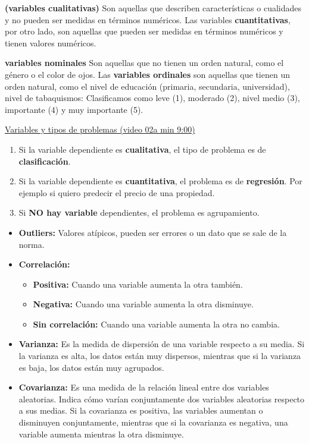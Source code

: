 \documentclass[../main.tex]{subfiles}
\begin{document}
    \begin{definition}\textbf{(variables cualitativas)} 
        Son aquellas que describen características o cualidades y no pueden ser medidas en términos numéricos. Las variables \textbf{cuantitativas}, por otro lado, son aquellas que pueden ser medidas en términos numéricos y tienen valores numéricos.
    \end{definition}
        
    \begin{definition}\textbf{variables nominales}
        Son aquellas que no tienen un orden natural, como el género o el color de ojos. Las \textbf{variables ordinales} son aquellas que tienen un orden natural, como el nivel de educación (primaria, secundaria, universidad), nivel de tabaquismos: Clasificamos como leve (1), moderado (2), nivel medio (3), importante (4) y muy importante (5).
    \end{definition}

	 
     \underline{Variables y tipos de problemas (video 02a min 9:00)}
     \begin{enumerate}
        \item 
            Si la variable dependiente es \textbf{cualitativa}, el tipo de problema es de \textbf{clasificación}. 
        \item 
            Si la variable dependiente es \textbf{cuantitativa}, el problema es de \textbf{regresión}.
            Por ejemplo si quiero predecir el precio de una propiedad.
        \item 
            Si \textbf{NO hay variable} dependientes, el problema es agrupamiento.
     \end{enumerate}
	 
     \begin{itemize}
        \item \textbf{Outliers:} Valores atípicos, pueden ser errores o un dato que se sale de la norma.
        \item \textbf{Correlación:} 
            \begin{itemize}
                \item \textbf{Positiva:} Cuando una variable aumenta la otra también.
                \item \textbf{Negativa:} Cuando una variable aumenta la otra disminuye.
                \item \textbf{Sin correlación:} Cuando una variable aumenta la otra no cambia.
            \end{itemize}
        \item \textbf{Varianza:} Es la medida de dispersión de una variable respecto a su media. Si la varianza es alta, los datos están muy dispersos, mientras que si la varianza es baja, los datos están muy agrupados.
        \item \textbf{Covarianza:} Es una medida de la relación lineal entre dos variables aleatorias. Indica cómo varían conjuntamente dos variables aleatorias respecto a sus medias. Si la covarianza es positiva, las variables aumentan o disminuyen conjuntamente, mientras que si la covarianza es negativa, una variable aumenta mientras la otra disminuye.
    \end{itemize}
\end{document}
